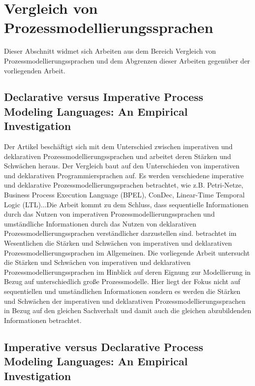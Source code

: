 \section{Vergleich von Prozessmodellierungssprachen}

Dieser Abschnitt widmet sich Arbeiten aus dem Bereich Vergleich von Prozessmodellierungssprachen und dem Abgrenzen dieser Arbeiten gegenüber der vorliegenden Arbeit.

\subsection{Declarative versus Imperative Process Modeling Languages: An Empirical Investigation}

Der Artikel \cite{fahland2009} beschäftigt sich mit dem Unterschied zwischen imperativen und deklarativen Prozessmodellierungssprachen und arbeitet deren Stärken und Schwächen heraus. Der Vergleich baut auf den Unterschieden von imperativen und deklarativen Programmiersprachen auf. Es werden verschiedene imperative und deklarative Prozessmodellierungssprachen betrachtet, wie z.B. Petri-Netze, Business Process Execution Language (BPEL), ConDec, Linear-Time Temporal Logic (LTL)...Die Arbeit kommt zu dem Schluss, dass sequentielle Informationen durch das Nutzen von imperativen Prozessmodellierungssprachen und umständliche Informationen durch das Nutzen von deklarativen Prozessmodellierungssprachen verständlicher darzustellen sind.\newline
\cite{fahland2009} betrachtet im Wesentlichen die Stärken und Schwächen von imperativen und deklarativen Prozessmodellierungssprachen im Allgemeinen. Die vorliegende Arbeit untersucht die Stärken und Schwächen von imperativen und deklarativen Prozessmodellierungssprachen im Hinblick auf deren Eignung zur Modellierung in Bezug auf unterschiedlich große Prozessmodelle. Hier liegt der Fokus nicht auf sequentiellen und umständlichen Informationen sondern es werden die Stärken und Schwächen der imperativen und deklarativen Prozessmodellierungssprachen in Bezug auf den gleichen Sachverhalt und damit auch die gleichen abzubildenden Informationen betrachtet.\newline


\subsection{Imperative versus Declarative Process Modeling Languages: An Empirical Investigation}

